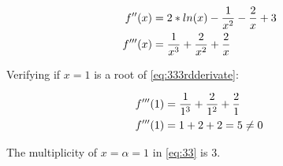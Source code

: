 	\begin{align}
		f''(x) &= 2*ln(x) - \frac{1}{x^2} - \frac{2}{x} + 3& \notag \\
		f'''(x) &=  \frac{1}{x^3} + \frac{2}{x^2} + \frac{2}{x}&
	\label{eq:333rdderivate}
	\end{align}

	Verifying if $x=1$ is a root of \cref{eq:333rdderivate}:

	\begin{align}
		f'''(1) &=  \frac{1}{1^3} + \frac{2}{1^2} + \frac{2}{1}& \notag \\
		f'''(1) &=  1 + 2 + 2 = 5 \neq 0&
	\label{eq:333rdderivate1x}
	\end{align}

	The multiplicity of $x = \alpha = 1$ in \cref{eq:33} is $3$.